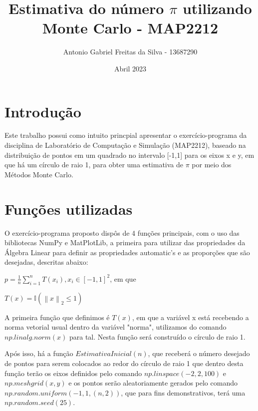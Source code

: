 \documentclass[a4paper]{article}
\title{Estimativa do número $\pi$ utilizando Monte Carlo - MAP2212}
\author{Antonio Gabriel Freitas da Silva - 13687290}
\date{Abril 2023}
\begin{document}
\maketitle

\section{Introdução}

Este trabalho possui como intuito princpial apresentar o exercício-programa da disciplina de Laboratório de Computação e Simulação (MAP2212), baseado na distribuição de pontos em um quadrado no intervalo [-1,1] para os eixos x e y, em que há um círculo de raio 1, para obter uma estimativa de $\pi$ por meio dos Métodos Monte Carlo.

\section{Funções utilizadas}

O exercício-programa proposto dispôs de 4 funções principais, com o uso das bibliotecas NumPy e MatPlotLib, a primeira para utilizar das propriedades da Álgebra Linear para definir as propriedades automatic's e as proporções que são desejadas, descritas abaixo:  

\vspace{0.5cm}

\begin{center}

$p = \frac{1}{n}\sum_{i=1}^{n} T(x_i), x_i \in \left[ -1,1 \right]^2$, em que

\end{center}

\vspace{0.5cm}

\begin{center}

$T(x) = \mathds{I}(\left\| x 
\right\|_2 \le 1)$

\end{center}

\vspace{0.5cm}

A primeira função que definimos é $T(x)$, em que a variável x está recebendo a norma vetorial usual dentro da variável "norma", utilizamos do comando $np.linalg.norm(x)$ para tal. Nesta função será construído o círculo de raio 1.

Após isso, há a função $EstimativaInicial(n)$, que receberá o número desejado de pontos para serem colocados ao redor do círculo de raio 1 que dentro desta função terão os eixos definidos pelo comando $np.linspace(-2, 2, 100)$ e $np.meshgrid(x, y)$ e os pontos serão aleatoriamente gerados pelo comando $np.random.uniform(-1, 1, (n, 2))$, que para fins demonstrativos, terá uma $np.random.seed(25)$.
\end{document}
